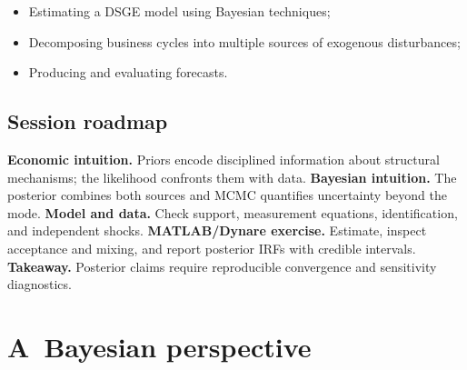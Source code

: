\documentclass[a4paper,12pt]{article}%
\begin{document}
\FRONTPAGE%

\vspace{4ex}
\begin{myobjs}%


\begin{itemize}
\item Estimating a DSGE model using Bayesian techniques;

\item Decomposing business cycles into multiple sources of exogenous disturbances;

\item Producing and evaluating forecasts.
\end{itemize}

%

\end{myobjs}%

\subsection*{Session roadmap}
\textbf{Economic intuition.} Priors encode disciplined information about
structural mechanisms; the likelihood confronts them with data.
\textbf{Bayesian intuition.} The posterior combines both sources and MCMC
quantifies uncertainty beyond the mode. \textbf{Model and data.} Check support,
measurement equations, identification, and independent shocks.
\textbf{MATLAB/Dynare exercise.} Estimate, inspect acceptance and mixing, and
report posterior IRFs with credible intervals. \textbf{Takeaway.} Posterior
claims require reproducible convergence and sensitivity diagnostics.


\newpage

\section{A\ Bayesian perspective}
\end{document}
